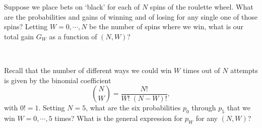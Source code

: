 \newpage %
Suppose we place  bets on `black' for each of $N$ spins of the roulette wheel.
What are the probabilities and gains of winning and of losing for any single one of those spins?
Letting $W = 0, \cdots, N$ be the number of spins where we win, what is our total gain $G_W$ as a function of $(N, W)$?
\begin{mdframed}
  \ \\[100 pt]
\end{mdframed}
Recall that the number of different ways we could win $W$ times out of $N$ attempts is given by the binomial coefficient
\begin{equation*}
  \binom{N}{W} = \frac{N!}{W! \; (N - W)!},
\end{equation*}
with $0! = 1$.
Setting $N = 5$, what are the six probabilities $p_0$ through $p_5$ that we win $W = 0, \cdots, 5$ times?
What is the general expression for $p_W$ for any $(N, W)$?
\begin{mdframed}
  \ \\[100 pt]
\end{mdframed}

